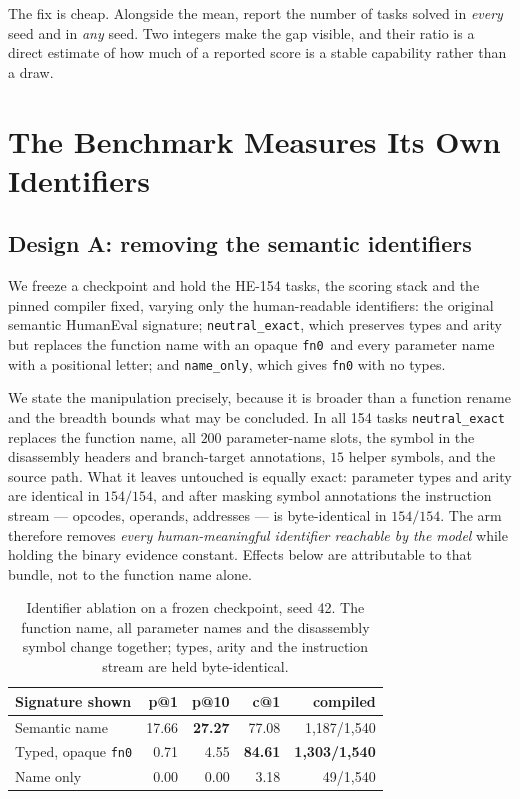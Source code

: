 \documentclass[conference]{IEEEtran}
\newcommand{\fnz}{\texttt{fn0}\xspace}
\begin{document}
The fix is cheap. Alongside the mean, report the number of tasks solved in
\emph{every} seed and in \emph{any} seed. Two integers make the gap visible, and
their ratio is a direct estimate of how much of a reported score is a stable
capability rather than a draw.

\section{The Benchmark Measures Its Own Identifiers}
\label{sec:validity}

\subsection{Design A: removing the semantic identifiers}
We freeze a checkpoint and hold the HE-154 tasks, the scoring stack and the
pinned compiler fixed, varying only the human-readable identifiers:
the original semantic HumanEval signature; \texttt{neutral\_exact}, which
preserves types and arity but replaces the function name with an opaque \fnz\ and
every parameter name with a positional letter; and \texttt{name\_only}, which
gives \fnz with no types.

We state the manipulation precisely, because it is broader than a function
rename and the breadth bounds what may be concluded. In all 154 tasks
\texttt{neutral\_exact} replaces the function name, all $200$ parameter-name
slots, the symbol in the disassembly headers and branch-target annotations, $15$
helper symbols, and the source path. What it leaves untouched is equally exact:
parameter types and arity are identical in $154/154$, and after masking symbol
annotations the instruction stream --- opcodes, operands, addresses --- is
byte-identical in $154/154$. The arm therefore removes \emph{every human-meaningful
identifier reachable by the model} while holding the binary evidence constant.
Effects below are attributable to that bundle, not to the function name alone.

\begin{table}[t]
\caption{Identifier ablation on a frozen checkpoint, seed 42. The function name,
all parameter names and the disassembly symbol change together; types, arity and
the instruction stream are held byte-identical.}
\label{tab:sig}
\centering\footnotesize
\begin{tabular}{@{}lrrrr@{}}
\toprule
\textbf{Signature shown} & \textbf{p@1} & \textbf{p@10} & \textbf{c@1} & \textbf{compiled}\\
\midrule
Semantic name      & 17.66 & \textbf{27.27} & 77.08 & 1{,}187/1{,}540\\
Typed, opaque \fnz & 0.71  & 4.55  & \textbf{84.61} & \textbf{1{,}303/1{,}540}\\
Name only          & 0.00  & 0.00  & 3.18  & 49/1{,}540\\
\bottomrule
\end{tabular}
\end{table}
\end{document}
